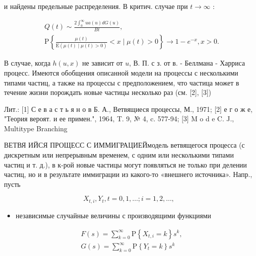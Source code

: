 \documentclass[10pt]{article}
\begin{document}
и найдены предельные распределения. В критич. случае при $t \rightarrow \infty$ :



\[

\begin{aligned}

& Q(t) \sim \frac{2 \int_{0}^{\infty} u a(u) d G(u)}{B t}, \\

& \mathrm{P}\left\{\frac{\mu(t)}{\mathrm{E}(\mu(t) \mid \mu(t)>0)}<x \mid \mu(t)>0\right\} \rightarrow 1-e^{-x}, x>0 .

\end{aligned}

\]



В случае, когда $h(u, x)$ не зависит от $u$, В. П. с з. от в. - Беллмана - Харриса процесс. Имеются обобщения описанной модели на процессы с несколькими типами частиц, а также на процессы с предположением, что частица может в течение жизни порождать новые частицы несколько раз (см. [2], [3])



Лит.: [1] С е в а с т ь я н о в Б. А., Ветвящиеся процессы, М., 1971; [2] е г о ж е, "Теория вероят. и ее примен.", 1964, T. 9, № 4, c. 577-94; [3] M o d e C. J., Multitype Branching



ВЕТВЯ ИЙСЯ ПРОЩЕСС С ИММИГРАЦИЕЙмодель ветвящегося процесса (с дискретным или непрерывным временем, с одним или несколькими типами частиц и т. д.), в к-рой новые частицы могут появляться не только при делении частиц, но и в результате иммиграции из какого-то «внешнего источника». Напр., пусть



\[

X_{t, i}, Y_{t}, t=0,1, \ldots ; i=1,2, \ldots,

\]



\begin{itemize}

  \item независимые случайные величины с производящими функциями

\end{itemize}



\[

\begin{aligned}

& F(s)=\sum_{k=0}^{\infty} \mathrm{P}\left\{X_{t, i}=k\right\} s^{k}, \\

& G(s)=\sum_{k=0}^{\infty} \mathrm{P}\left\{Y_{t}=k\right\} s^{k}

\end{aligned}

\]
\end{document}
